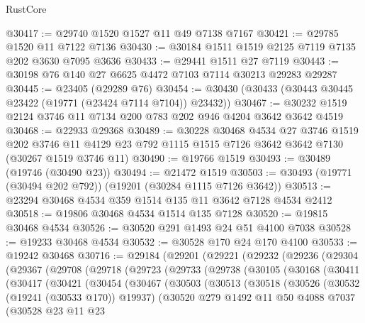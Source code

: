 \begin{lexlean}{RustCore}
\begin{coremodule}
@30417 := @29740 @1520 @1527 @11 @49 @7138 @7167
@30421 := @29785 @1520 @11 @7122 @7136
@30430 := @30184 @1511 @1519 @2125 @7119 @7135 @202 @3630 @7095 @3636
@30433 := @29441 @1511 @27 @7119
@30443 := @30198 @76 @140 @27 @6625 @4472 @7103 @7114 @30213 @29283 @29287
@30445 := @23405 (@29289 @76)
@30454 := @30430 (@30433 (@30443 @30445 @23422 (@19771 (@23424 @7114 @7104)) @23432))
@30467 := @30232 @1519 @2124 @3746 @11 @7134 @200 @783 @202 @946 @4204 @3642 @3642 @4519
@30468 := @22933 @29368
@30489 := @30228
    @30468
    @4534
    @27
    @3746
    @1519
    @202
    @3746
    @11
    @4129
    @23
    @792
    @1115
    @1515
    @7126
    @3642
    @3642
    @7130
    (@30267 @1519 @3746 @11)
@30490 := @19766 @1519
@30493 := @30489 (@19746 (@30490 @23))
@30494 := @21472 @1519
@30503 := @30493 (@19771 (@30494 @202 @792)) (@19201 (@30284 @1115 @7126 @3642))
@30513 := @23294 @30468 @4534 @359 @1514 @135 @11 @3642 @7128 @4534 @2412
@30518 := @19806 @30468 @4534 @1514 @135 @7128
@30520 := @19815 @30468 @4534
@30526 := @30520 @291 @1493 @24 @51 @4100 @7038
@30528 := @19233 @30468 @4534
@30532 := @30528 @170 @24 @170 @4100
@30533 := @19242 @30468
@30716 := @29184
    (@29201
      (@29221
        (@29232
          (@29236
            (@29304
              (@29367
                (@29708
                  (@29718
                    (@29723
                      (@29733
                        (@29738
                          (@30105
                            (@30168
                              (@30411
                                (@30417
                                  (@30421
                                    (@30454
                                      (@30467
                                        (@30503
                                          (@30513
                                            (@30518
                                              (@30526
                                                (@30532 (@19241 (@30533 @170)) @19937)
                                                (@30520
                                                  @279
                                                  @1492
                                                  @11
                                                  @50
                                                  @4088
                                                  @7037
                                                  (@30528
                                                    @23
                                                    @11
                                                    @23

\end{coremodule}
\end{lexlean}
